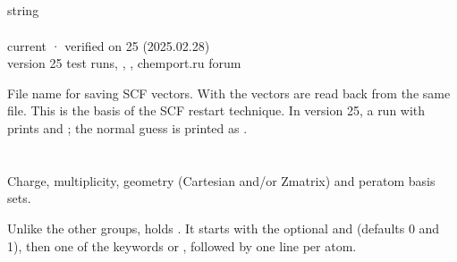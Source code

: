\documentclass[letterpaper,10pt,english,openany,oneside]{sphinxmanual}
\begin{document}
\sphinxAtStartPar
{} {\hyperref[\detokenize{reference/d2edr2:d2edr2-steps}]{}}


\subsection{}
\label{\detokenize{reference/control:save}}\label{\detokenize{reference/control:control-save}}
\ignorespaces 
\sphinxAtStartPar
{} string\\
 \\
 current · verified on 25 (2025.02.28)\\
 version 25 test runs, , , chemport.ru forum

\sphinxAtStartPar
File name for saving SCF vectors. With  the vectors are read back from the same file.
This is the basis of the SCF restart technique. In version 25, a run with  prints
 and ; the normal guess is printed as .

\sphinxAtStartPar
{} {\hyperref[\detokenize{reference/guess:guess-read}]{}}

\sphinxstepscope




\section{}
\label{\detokenize{reference/molecule:molecule}}\label{\detokenize{reference/molecule:group-molecule}}\label{\detokenize{reference/molecule::doc}}
\ignorespaces 
\sphinxAtStartPar
Charge, multiplicity, geometry (Cartesian and/or Z\sphinxhyphen{}matrix) and per\sphinxhyphen{}atom basis sets.

\sphinxAtStartPar
Unlike the other groups,  holds . It starts with the optional  and 
(defaults 0 and 1), then one of the keywords  or , followed by one line per atom.
\end{document}
